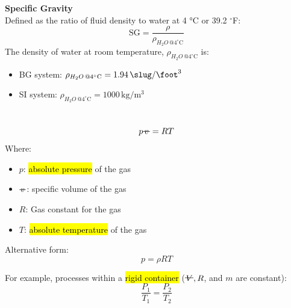 ﻿\documentclass[12pt]{article}
\newcommand{\vol}{\mathord{\text{\ooalign{\hidewidth $V$\hidewidth\cr\kern-0.5pt\raisebox{0.8ex}{\rule[0pt]{1em}{0.5pt}}}}}}
\newcommand{\svol}{%
  \mathord{\text{\ooalign{%
    \hfil$v$\hfil\cr
    \hfil\rule[0.6ex]{0.8em}{0.5pt}\hfil
  }}}%
}
\begin{document}
\textbf{Specific Gravity}\\
Defined as the ratio of fluid density to water at 4 \unit{\celsius} or 39.2 $^\circ$F:
\[\text{SG} = \frac{\rho}{\rho_{H_2O\,@ 4^\circ \text{C}}}\]
The density of water at room temperature, $\rho_{H_2O\,@ 4^\circ \text{C}}$ is:
\begin{itemize}
    \item BG system: $\rho_{H_2O\,@ 4^\circ \text{C}} = 1.94\,\unit{\slug\per\cubic\foot}$
    \item SI system: $\rho_{H_2O\,@ 4^\circ \text{C}} = 1000\,\unit{\kilogram\per\cubic\meter}$
\end{itemize}
\begin{center}
\end{center}
\section*{}
\[p\svol = RT\]
Where:
\begin{itemize}
    \item $p$: \hl{absolute pressure} of the gas
    \item $\svol$: specific volume of the gas
    \item $R$: Gas constant for the gas
    \item $T$: \hl{absolute temperature} of the gas
\end{itemize}
Alternative form:
\[p = \rho RT\]
\begin{examplebox}
For example, processes within a \hl{rigid container} ($\vol,R$, and $m$ are constant):
\[\frac{P_1}{T_1} = \frac{P_2}{T_2}\]
\end{examplebox}
\end{document}

